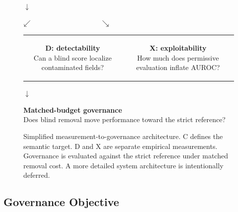 \documentclass[sigconf,review]{acmart}
\begin{document}
\begin{figure}[t]
\centering
\setlength{\fboxsep}{5pt}
\par\vspace{2pt}$\downarrow$\par\vspace{2pt}
\par\vspace{2pt}$\swarrow\hspace{0.30\columnwidth}\searrow$\par\vspace{2pt}
\begin{tabular}{@{}cc@{}}
\colorbox{LBLavender!45}{\parbox{0.39\columnwidth}{\centering
\textbf{D: detectability}\\Can a blind score localize contaminated fields?}} &
\colorbox{LBCoral!35}{\parbox{0.39\columnwidth}{\centering
\textbf{X: exploitability}\\How much does permissive evaluation inflate AUROC?}}
\end{tabular}
\par\vspace{4pt}$\downarrow$\par\vspace{2pt}
\colorbox{LBSage!45}{\parbox{0.87\columnwidth}{\centering
\textbf{Matched-budget governance}\\Does blind removal move performance toward the strict reference?}}
\caption{Simplified measurement-to-governance architecture. C defines the
semantic target. D and X are separate empirical measurements. Governance is
evaluated against the strict reference under matched removal cost. A more
detailed system architecture is intentionally deferred.}
\label{fig:architecture}
\end{figure}

\subsection{Governance Objective}
\end{document}
